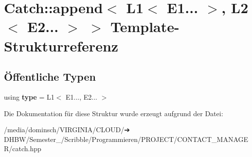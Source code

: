 \hypertarget{structCatch_1_1append_3_01L1_3_01E1_8_8_8_01_4_00_01L2_3_01E2_8_8_8_01_4_01_4}{}\section{Catch\+:\+:append$<$ L1$<$ E1... $>$, L2$<$ E2... $>$ $>$ Template-\/\+Strukturreferenz}
\label{structCatch_1_1append_3_01L1_3_01E1_8_8_8_01_4_00_01L2_3_01E2_8_8_8_01_4_01_4}
\subsection*{Öffentliche Typen}
\begin{DoxyCompactItemize}
\item 
\mbox{\label{structCatch_1_1append_3_01L1_3_01E1_8_8_8_01_4_00_01L2_3_01E2_8_8_8_01_4_01_4_a1cfbd4f828534748c95543b4eac962cd}} 
using {\bfseries type} = L1$<$ E1..., E2... $>$
\end{DoxyCompactItemize}


Die Dokumentation für diese Struktur wurde erzeugt aufgrund der Datei\+:\begin{DoxyCompactItemize}
\item 
/media/dominsch/\+V\+I\+R\+G\+I\+N\+I\+A/\+C\+L\+O\+U\+D/➔ D\+H\+B\+W/\+Semester\+\_/\+Scribble/\+Programmieren/\+P\+R\+O\+J\+E\+C\+T/\+C\+O\+N\+T\+A\+C\+T\+\_\+\+M\+A\+N\+A\+G\+E\+R/catch.\+hpp\end{DoxyCompactItemize}
